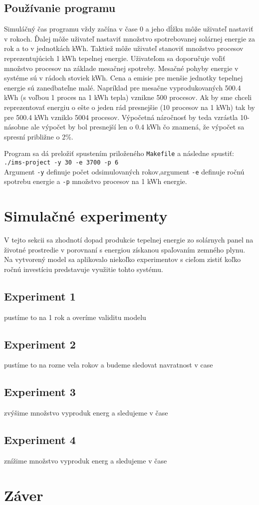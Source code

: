 \documentclass[a4paper, 11pt]{article}
\begin{document}
\subsection{Používanie programu}
Simuláčný čas programu vždy začína v čase 0 a jeho dĺžku môže uživateľ nastaviť v rokoch. Ďalej môže uživateľ nastaviť množstvo spotrebovanej solárnej energie za rok a to v jednotkách kWh. Taktiež môže uživateľ stanoviť množstvo procesov reprezentujúcich 1 kWh tepelnej energie. Uživateľom sa doporučuje voľiť množstvo procesov na základe mesačnej spotreby. Mesačné pohyby energie v systéme sú v rádoch stoviek kWh. Cena a emisie pre menšie jednotky tepelnej energie sú zanedbateľne malé. Napríklad pre mesačne vyprodukovaných 500.4 kWh (s voľbou 1 proces na 1 kWh tepla) vznikne 500 procesov. Ak by sme chceli reprezentovať energiu o ešte o jeden rád presnejšie (10 procesov na 1 kWh) tak by pre 500.4 kWh vzniklo 5004 procesov. Výpočetná náročnosť by teda vzrástla 10-násobne ale výpočet by bol presnejší len o 0.4 kWh čo znamená, že výpočet sa spresní približne o 2\%.

Program sa dá preložiť spustením priloženého \texttt{Makefile} a následne spustiť:\\
\texttt{./ims-project -y 30 -e 3700 -p 6} \\
Argument \texttt{-y} definuje počet odsimulovaných rokov,argument \texttt{-e} definuje ročnú spotrebu energie a \texttt{-p} množstvo procesov na 1 kWh energie.

\section{Simulačné experimenty}
V tejto sekcii sa zhodnotí dopad produkcie tepelnej energie zo solárnych panel na životné prostredie v porovnaní s energiou získanou spaľovaním zemného plynu. Na vytvorený model sa aplikovalo niekoľko experimentov s cieľom zistiť koľko ročnú investíciu predstavuje využitie tohto systému.

\subsection{Experiment 1}
pustíme to na 1 rok a overíme validitu  modelu

\subsection{Experiment 2}
pustíme to na rozne vela rokov a budeme sledovat navratnost v case

\subsection{Experiment 3}
zvýšime množstvo vyproduk energ a sledujeme v čase

\subsection{Experiment 4}
znížime množstvo vyproduk energ a sledujeme v čase

\section{Záver}

\newpage


\end{document}
